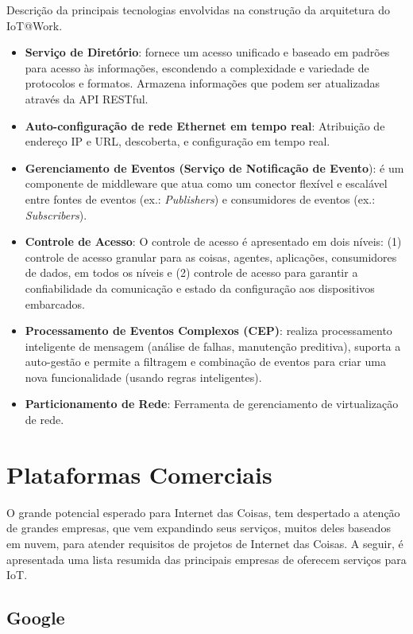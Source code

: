Descrição da principais tecnologias envolvidas na construção da arquitetura
do IoT@Work\cite{IoTWork:site}.
\begin{itemize}
\item \textbf{Serviço de Diretório}: fornece um acesso unificado e baseado
em padrões para acesso às informações, escondendo a complexidade e
variedade de protocolos e formatos. Armazena informações que podem
ser atualizadas através da API RESTful.
\item \textbf{Auto-configuração de rede Ethernet em tempo real}: Atribuição
de endereço IP e URL, descoberta, e configuração em tempo real.
\item \textbf{Gerenciamento de Eventos (Serviço de Notificação de Evento}):
é um componente de middleware que atua como um conector flexível e
escalável entre fontes de eventos (ex.: \emph{Publishers}) e consumidores
de eventos (ex.: \emph{Subscribers}).
\item \textbf{Controle de Acesso}: O controle de acesso é apresentado em
dois níveis: (1) controle de acesso granular para as coisas, agentes,
aplicações, consumidores de dados, em todos os níveis e (2) controle
de acesso para garantir a confiabilidade da comunicação e estado da
configuração aos dispositivos embarcados.
\item \textbf{Processamento de Eventos Complexos (CEP)}: realiza processamento
inteligente de mensagem (análise de falhas, manutenção preditiva),
suporta a auto-gestão e permite a filtragem e combinação de eventos
para criar uma nova funcionalidade (usando regras inteligentes).
\item \textbf{Particionamento de Rede}: Ferramenta de gerenciamento de virtualização
de rede.
\end{itemize}

\section{Plataformas Comerciais}

O grande potencial esperado para Internet das Coisas\cite{GoldmanSachs2014,url:cisco:iot:2015,url:webintel:2015},
tem despertado a atenção de grandes empresas, que vem expandindo seus
serviços, muitos deles baseados em nuvem, para atender requisitos
de projetos de Internet das Coisas. A seguir, é apresentada uma lista
resumida das principais empresas de oferecem serviços para IoT.

\subsection{Google}

